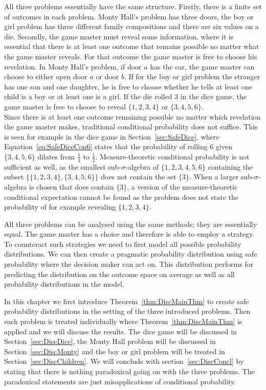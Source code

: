\documentclass[a4paper]{report}
\theoremstyle{plain}
\theoremstyle{definition}
\theoremstyle{remark}
\numberwithin{equation}{chapter}
\DeclareMathOperator{\1}{\mathbbm{1}}
\begin{document}
All three problems essentially have the same structure. Firstly, there is a finite set of outcomes in each problem. Monty Hall's problem has three doors, the boy or girl problem has three different family compositions and there are six values on a die. Secondly, the game master must reveal some information, where it is essential that there is at least one outcome that remains possible no matter what the game master reveals. For that outcome the game master is free to choose his revelation. In Monty Hall's problem, if door $a$ has the car, the game master can choose to either open door $a$ or door $b$. If for the boy or girl problem the stranger has one son and one daughter, he is free to choose whether he tells at least one child is a boy or at least one is a girl. If the die rolled 3 in the dice game, the game master is free to choose to reveal $\{1,2,3,4\}$ or $\{3,4,5,6\}$.\\
Since there is at least one outcome remaining possible no matter which revelation the game master makes, traditional conditional probability does not suffice. This is seen for example in the dice game in Section~\ref{sec:SafeDice}, where Equation~\ref{eq:SafeDiceCon6} states that the probability of rolling $6$ given $\{3,4,5,6\}$ dilates from $\frac{1}{4}$ to $\frac{1}{2}$. Measure-theoretic conditional probability is not sufficient as well, as the smallest sub-$\sigma$-algebra of $\{1,2,3,4,5,6\}$ containing the subset $\{\{1,2,3,4\},\{3,4,5,6\}\}$ does not contain the set $\{3\}$. When a larger sub-$\sigma$-algebra is chosen that does contain $\{3\}$, a version of the measure-theoretic conditional expectation cannot be found as the problem does not state the probability of for example revealing $\{1,2,3,4\}$.

All three problems can be analysed using the same methods; they are essentially equal. The game master has a choice and therefore is able to employ a strategy. To counteract such strategies we need to first model all possible probability distributions. We can then create a pragmatic probability distribution using safe probability where the decision maker can act on. This distribution performs for predicting the distribution on the outcome space on average as well as all probability distributions in the model.

In this chapter we first introduce Theorem~\ref{thm:DiscMainThm} to create safe probability distributions in the setting of the three introduced problems. Then each problem is treated individually where Theorem~\ref{thm:DiscMainThm} is applied and we will discuss the results. The dice game will be discussed in Section~\ref{sec:DiscDice}, the Monty Hall problem will be discussed in Section~\ref{sec:DiscMonty} and the boy or girl problem will be treated in Section~\ref{sec:DiscChildren}. We will conclude with section~\ref{sec:DiscConcl} by stating that there is nothing paradoxical going on with the three problems. The paradoxical statements are just misapplications of conditional probability.
\end{document}

